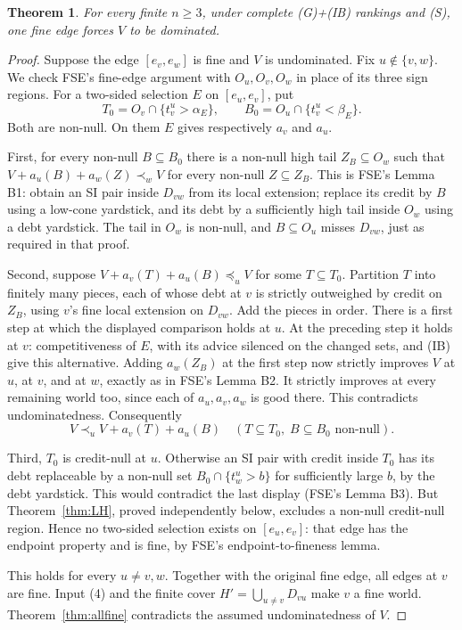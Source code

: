 \documentclass[11pt]{article}
\newtheorem{theorem}{Theorem}
\theoremstyle{remark}\newtheorem{remark}[theorem]{Remark}
\begin{document}
\begin{theorem}\label{thm:fineedge}
For every finite $n\ge3$, under complete (G)+(IB) rankings and (S),
one fine edge forces $V$ to be dominated.
\end{theorem}
\begin{proof}
Suppose the edge $[e_v,e_w]$ is fine and $V$ is undominated.
Fix $u\notin\{v,w\}$. We check FSE's fine-edge argument with
$O_u,O_v,O_w$ in place of its three sign regions.
For a two-sided selection $E$ on $[e_u,e_v]$, put
\[
 T_0=O_v\cap\{t^u_v>\alpha_E\},\qquad
 B_0=O_u\cap\{t^u_v<\beta_E\}.
\]
Both are non-null. On them $E$ gives respectively $a_v$ and $a_u$.

First, for every non-null $B\subseteq B_0$ there is a non-null high
tail $Z_B\subseteq O_w$ such that
$V+a_u(B)+a_w(Z)\prec_wV$ for every non-null $Z\subseteq Z_B$.
This is FSE's Lemma B1: obtain an SI pair inside $D_{vw}$ from its
local extension; replace its credit by $B$ using a low-cone yardstick,
and its debt by a sufficiently high tail inside $O_w$ using a debt
yardstick. The tail in $O_w$ is non-null, and $B\subseteq O_u$ misses
$D_{vw}$, just as required in that proof.

Second, suppose $V+a_v(T)+a_u(B)\preceq_uV$ for some $T\subseteq T_0$.
Partition $T$ into finitely many pieces, each of whose debt at $v$ is
strictly outweighed by credit on $Z_B$, using $v$'s fine local
extension on $D_{vw}$. Add the pieces in order. There is a first step
at which the displayed comparison holds at $u$. At the preceding
step it holds at $v$: competitiveness of $E$, with its advice silenced
on the changed sets, and (IB) give this alternative.
Adding $a_w(Z_B)$ at the first step now strictly improves $V$ at $u$,
at $v$, and at $w$, exactly as in FSE's Lemma B2. It strictly improves
at every remaining world too, since each of $a_u,a_v,a_w$ is good
there. This contradicts undominatedness. Consequently
\[
 V\prec_uV+a_v(T)+a_u(B)
 \quad(T\subseteq T_0,\; B\subseteq B_0\text{ non-null}).
\]

Third, $T_0$ is credit-null at $u$. Otherwise an SI pair with credit
inside $T_0$ has its debt replaceable by a non-null set
$B_0\cap\{t^u_w>b\}$ for sufficiently large $b$, by the debt yardstick.
This would contradict the last display (FSE's Lemma B3). But
Theorem~\ref{thm:LH}, proved independently below, excludes a non-null
credit-null region. Hence no two-sided selection exists on
$[e_u,e_v]$: that edge has the endpoint property and is fine, by
FSE's endpoint-to-fineness lemma.

This holds for every $u\ne v,w$. Together with the original fine
edge, all edges at $v$ are fine. Input (4) and the finite cover
$H'=\bigcup_{u\ne v}D_{vu}$ make $v$ a fine world.
Theorem~\ref{thm:allfine} contradicts the assumed undominatedness of $V$.
\end{proof}
\end{document}
